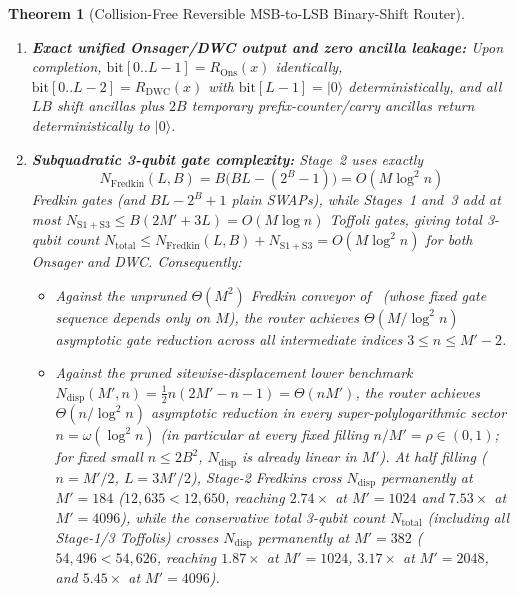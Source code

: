 \documentclass[11pt,a4paper]{article}
\newtheorem{theorem}{Theorem}
\theoremstyle{remark}
\newcommand{\ket}[1]{\lvert #1 \rangle}
\begin{document}
\begin{theorem}[Collision-Free Reversible MSB-to-LSB Binary-Shift Router]
\begin{enumerate}
\item[\textnormal{(ii)}] \textbf{Exact unified Onsager/DWC output and zero ancilla leakage:} Upon completion, $\mathrm{bit}[0..L-1] = R_{\mathrm{Ons}}(x)$ identically, $\mathrm{bit}[0..L-2] = R_{\mathrm{DWC}}(x)$ with $\mathrm{bit}[L-1] = \ket{0}$ deterministically, and all $L B$ shift ancillas plus $2B$ temporary prefix-counter/carry ancillas return deterministically to $\ket{0}$.
\item[\textnormal{(iii)}] \textbf{Subquadratic 3-qubit gate complexity:} Stage~2 uses exactly
\begin{equation}
\label{eq:fredkin_count}
N_{\mathrm{Fredkin}}(L, B) = B\bigl(B L - (2^B - 1)\bigr) = O(M \log^2 n)
\end{equation}
Fredkin gates (and $B L - 2^B + 1$ plain SWAPs), while Stages~1 and~3 add at most $N_{\mathrm{S1+S3}} \le B(2M' + 3L) = O(M \log n)$ Toffoli gates, giving total 3-qubit count $N_{\mathrm{total}} \le N_{\mathrm{Fredkin}}(L,B) + N_{\mathrm{S1+S3}} = O(M \log^2 n)$ for both Onsager and DWC. Consequently:
\begin{itemize}
\item Against the \emph{unpruned} $\Theta(M^2)$ Fredkin conveyor of~\cite{AKN26} (whose fixed gate sequence depends only on $M$), the router achieves $\Theta(M/\log^2 n)$ asymptotic gate reduction across all intermediate indices $3 \le n \le M'-2$.
\item Against the \emph{pruned} sitewise-displacement lower benchmark $N_{\mathrm{disp}}(M', n) = \frac{1}{2}n(2M' - n - 1) = \Theta(n M')$, the router achieves $\Theta(n/\log^2 n)$ asymptotic reduction in every super-polylogarithmic sector $n = \omega(\log^2 n)$ (in particular at every fixed filling $n/M' = \rho \in (0, 1)$; for fixed small $n \le 2B^2$, $N_{\mathrm{disp}}$ is already linear in $M'$). At half filling ($n = M'/2$, $L = 3M'/2$), Stage-2 Fredkins cross $N_{\mathrm{disp}}$ permanently at $M' = 184$ ($12{,}635 < 12{,}650$, reaching $2.74\times$ at $M' = 1024$ and $7.53\times$ at $M' = 4096$), while the conservative total 3-qubit count $N_{\mathrm{total}}$ (including all Stage-1/3 Toffolis) crosses $N_{\mathrm{disp}}$ permanently at $M' = 382$ ($54{,}496 < 54{,}626$, reaching $1.87\times$ at $M' = 1024$, $3.17\times$ at $M' = 2048$, and $5.45\times$ at $M' = 4096$).
\end{itemize}
\end{enumerate}
\end{theorem}
\end{document}
